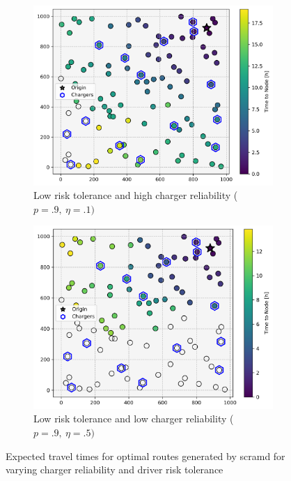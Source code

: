 \documentclass[12pt]{article}
\begin{document}
\begin{figure}[H]
\begin{subfigure}{.5\linewidth}
		\centering\includegraphics[width = \linewidth]{figs/parameter_factorial_10.png}
		\captionsetup{width=.8\linewidth}
		\caption{Low risk tolerance and high charger reliability ($p = .9,\ \eta = .1)$}
	\end{subfigure}%
	\begin{subfigure}{.5\linewidth}
		\centering\includegraphics[width = \linewidth]{figs/parameter_factorial_11.png}
		\captionsetup{width=.8\linewidth}
		\caption{Low risk tolerance and low charger reliability ($p = .9,\ \eta = .5)$}
	\end{subfigure}
	\caption{Expected travel times for optimal routes generated by \gls{scramd} for varying charger reliability and driver risk tolerance}
	\label{fig:parameter_factorial}
\end{figure}
\end{document}
